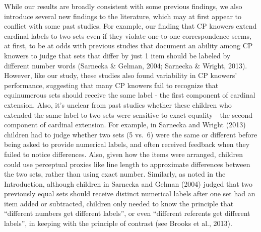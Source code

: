 \documentclass[
  man,floatsintext]{apa7}
\begin{document}
While our results are broadly consistent with some previous findings, we also introduce several new findings to the literature, which may at first appear to conflict with some past studies. For example, our finding that CP knowers extend cardinal labels to two sets even if they violate one-to-one correspondence seems, at first, to be at odds with previous studies that document an ability among CP knowers to judge that sets that differ by just 1 item should be labeled by different number words (Sarnecka \& Gelman, 2004; Sarnecka \& Wright, 2013). However, like our study, these studies also found variability in CP knowers' performance, suggesting that many CP knowers fail to recognize that equinumerous sets should receive the same label - the first component of cardinal extension. Also, it's unclear from past studies whether these children who extended the same label to two sets were sensitive to exact equality - the second component of cardinal extension. For example, in Sarnecka and Wright (2013) children had to judge whether two sets (5 vs.~6) were the same or different before being asked to provide numerical labels, and often received feedback when they failed to notice differences. Also, given how the items were arranged, children could use perceptual proxies like line length to approximate differences between the two sets, rather than using exact number. Similarly, as noted in the Introduction, although children in Sarnecka and Gelman (2004) judged that two previously equal sets should receive distinct numerical labels after one set had an item added or subtracted, children only needed to know the principle that ``different numbers get different labels'', or even ``different referents get different labels'', in keeping with the principle of contrast (see Brooks et al., 2013).
\end{document}
